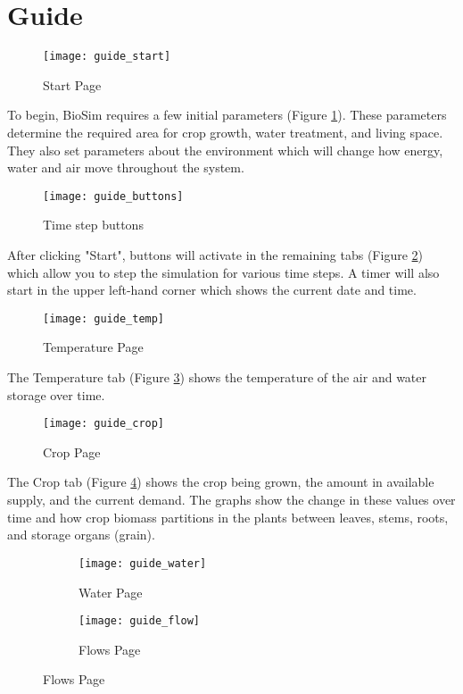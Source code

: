 \part{Guide}
\begin{figure}[h]
    \centering
    \texttt{[image: guide\_start]}
    \caption{Start Page}
    \label{fig:guide_start}
\end{figure}
To begin, BioSim requires a few initial parameters (Figure \ref{fig:guide_start}). These parameters determine the required area for crop growth, water treatment, and living space. They also set parameters about the environment which will change how energy, water and air move throughout the system. 

\begin{figure}[h]
    \centering
    \texttt{[image: guide\_buttons]}
    \caption{Time step buttons}
    \label{fig:guide_buttons}
\end{figure}

After clicking "Start", buttons will activate in the remaining tabs (Figure \ref{fig:guide_buttons}) which allow you to step the simulation for various time steps. A timer will also start in the upper left-hand corner which shows the current date and time.
\newpage

\begin{figure}[h]
    \centering
    \texttt{[image: guide\_temp]}
    \caption{Temperature Page}
    \label{fig:guide_temp}
\end{figure}

The Temperature tab (Figure \ref{fig:guide_temp}) shows the temperature of the air and water storage over time.


\begin{figure}[h]
    \centering
    \texttt{[image: guide\_crop]}
    \caption{Crop Page}
    \label{fig:guide_crop}
\end{figure}

The Crop tab (Figure \ref{fig:guide_crop}) shows the crop being grown, the amount in available supply, and the current demand. The graphs show the change in these values over time and how crop biomass partitions in the plants between leaves, stems, roots, and storage organs (grain).
\newpage

\begin{figure}[h]
    \centering
    \begin{subfigure}[h]{.47\textwidth}
        \centering
        \texttt{[image: guide\_water]}
        \caption{Water Page}
        \label{fig:guide_water}
    \end{subfigure}
    \hfill
    \begin{subfigure}[h]{.47\textwidth}
        \centering
        \texttt{[image: guide\_flow]}
        \caption{Flows Page}
        \label{fig:guide_flow}
    \end{subfigure}
\end{figure}


